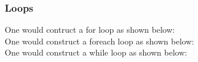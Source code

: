 \documentclass[12pt]{article}
\begin{document}
\subsubsection{Loops}
One would contruct a for loop as shown below:\\
{}\medbreak
One would construct a foreach loop as shown below:\\
{}\medbreak
One would construct a while loop as shown below:\\
{}
\pagebreak
\end{document}
